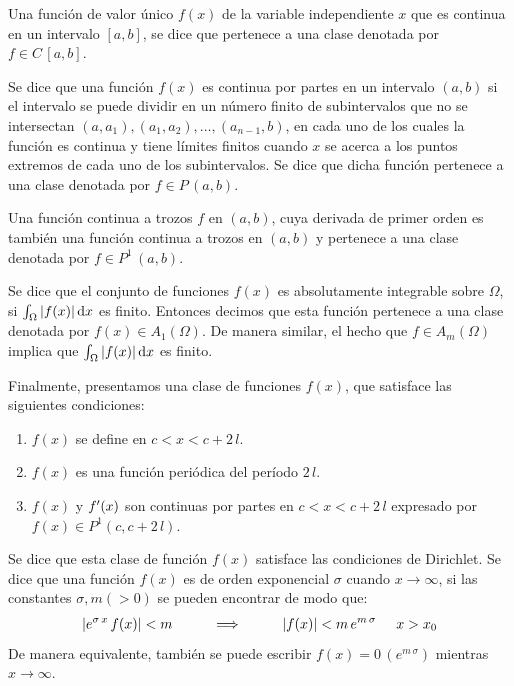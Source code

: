 Una función de valor único $f (x)$ de la variable independiente $x$ que es continua en un intervalo $[a, b]$, se dice que pertenece a una clase denotada por $f \in C \, [a, b]$.
\par
Se dice que una función $f (x)$ es continua por partes en un intervalo $(a, b)$ si el intervalo se puede dividir en un número finito de subintervalos que no se intersectan $(a, a_{1}), (a_{1}, a_{2}), \ldots, (a_{n -1}, b)$, en cada uno de los cuales la función es continua y tiene límites finitos cuando $x$ se acerca a los puntos extremos de cada uno de los subintervalos. Se dice que dicha función pertenece a una clase denotada por $f \in P \, (a, b)$.
\par
Una función continua a trozos $f$ en $(a, b)$, cuya derivada de primer orden es también una función continua a trozos en $(a, b)$ y pertenece a una clase denotada por $f \in P^{1} \, (a, b)$.
\par
Se dice que el conjunto de funciones $f (x)$ es absolutamente integrable sobre $\Omega$, si $\int_{\Omega}  \abs{f (x)} \dd{x}$ es finito. Entonces decimos que esta función pertenece a una clase denotada por $f (x) \in A_{1} (\Omega)$. De manera similar, el hecho que $f \in A_{m} (\Omega)$ implica que $\int_{\Omega}  \abs{f (x)} \dd{x}$ es finito.
\par
Finalmente, presentamos una clase de funciones $f (x)$, que satisface las siguientes condiciones:
\begin{enumerate}[label=\roman*]
\item $f (x)$ se define en $c < x < c + 2 \, l$.
\item $f (x)$ es una función periódica del período $2 \, l$.
\item $f (x)$ y ${f}^{\prime} (x)$ son continuas por partes en $c  < x <c + 2 \, l$ expresado por $f (x) \in P^{1} (c, c + 2 \, l)$.
\end{enumerate}
Se dice que esta clase de función $f (x)$ satisface las condiciones de Dirichlet. Se dice que una función $f (x)$ es de orden exponencial $\sigma$ cuando $x \to \infty$, si las constantes $\sigma, m (> 0)$ se pueden encontrar de modo que:
\begin{align*}
\abs{ e^{\sigma \, x} \, f(x)} < m \hspace{1cm} \Longrightarrow \hspace{1cm} \abs{f(x)} < m \, e^{m \, \sigma} \hspace{0.5cm} x > x_{0}
\end{align*}
De manera equivalente, también se puede escribir $f (x) = 0 \, (e^{m \, \sigma})$ mientras $x \to \infty$.

